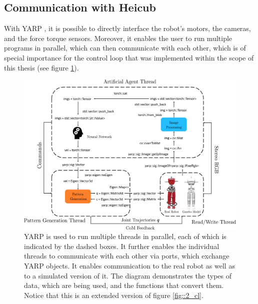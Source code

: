 \subsection{Communication with Heicub}
\label{sec::341_co}
With YARP \cite{metta2006yarp}, it is possible to directly interface the robot's motors, the cameras, and the force torque sensors. Moreover, it enables the user to run multiple programs in parallel, which can then communicate with each other, which is of special importance for the control loop that was implemented within the scope of this thesis (see figure \ref{fig::341_yarp}).
\begin{figure}[h!]
	\hspace*{-1cm}
	\includegraphics[scale=.4]{chapters/03_methods/img/yarp_diag.png}
	\caption{YARP is used to run multiple threads in parallel, each of which is indicated by the dashed boxes. It further enables the individual threads to communicate with each other via ports, which exchange YARP objects. It enables communication to the real robot as well as to a simulated version of it. The diagram demonstrates the types of data, which are being used, and the functions that convert them. Notice that this is an extended version of figure \ref{fig::2_cl}.}
	\label{fig::341_yarp}
\end{figure}
